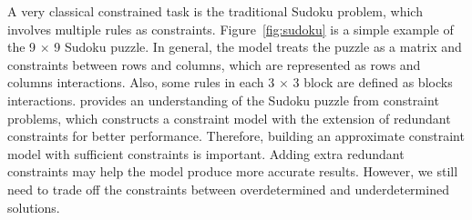 \par A very classical constrained task is the traditional Sudoku problem, which involves multiple rules as constraints. Figure~\ref{fig:sudoku} is a simple example of the 9 $\times$ 9 Sudoku puzzle. In general, the model treats the puzzle as a matrix and constraints between rows and columns, which are represented as rows and columns interactions. Also, some rules in each 3 $\times$ 3 block are defined as blocks interactions. \cite{SH:05} provides an understanding of the Sudoku puzzle from constraint problems, which constructs a constraint model with the extension of redundant constraints for better performance. Therefore, building an approximate constraint model with sufficient constraints is important. Adding extra redundant constraints may help the model produce more accurate results. However, we still need to trade off the constraints between overdetermined and underdetermined solutions. 

